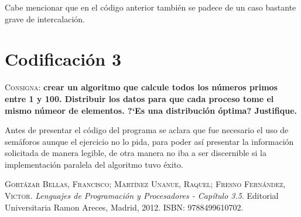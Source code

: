 \documentclass{article}
\begin{document}


Cabe mencionar que en el c\'odigo anterior tambi\'en se padece de un caso bastante grave de intercalaci\'on.

\section{Codificaci\'on 3}
\textsc{Consigna}: \textbf{crear un algoritmo que calcule todos los n\'umeros primos entre 1 y 100. Distribuir los datos para que cada proceso tome el mismo n\'umeor de elementos. ?`Es una distribuci\'on \'optima? Justifique.}

Antes de presentar el c\'odigo del programa se aclara que fue necesario el uso de sem\'aforos aunque el ejercicio no lo pida, para poder as\'i presentar la informaci\'on solicitada de manera legible, de otra manera no iba a ser discernible si la implementaci\'on paralela del algoritmo tuvo \'exito.






\begin{thebibliography}{99}
	\textsc{Gort\'azar Bellas, Francisco; Mart\'inez Unanue, Raquel; Fresno Fern\'andez, Victor}. \textit{Lenguajes de Programaci\'on y Procesadores - Cap\'itulo 3.5}. Editorial Universitaria Ramon Areces, Madrid, 2012. \textsc{ISBN: 9788499610702}.
\end{thebibliography}
\end{document}
